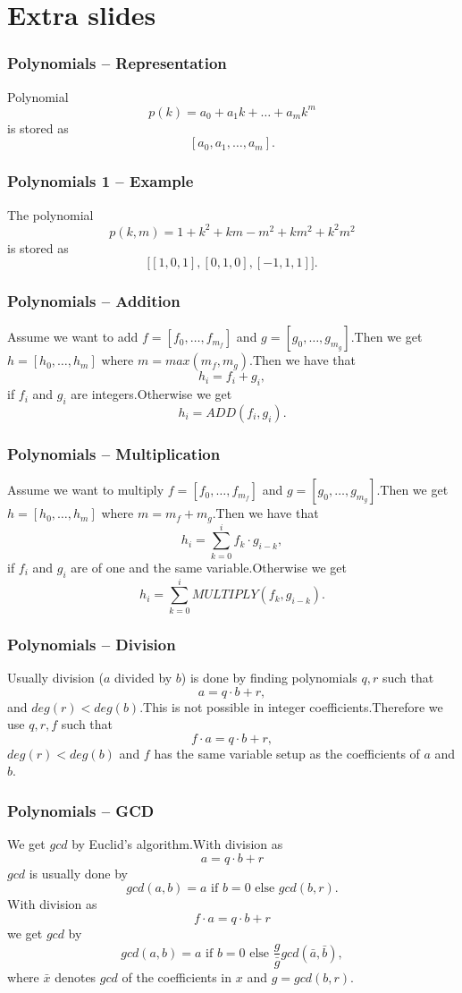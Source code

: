 \documentclass{beamer}
\begin{document}
\section*{Extra slides}%
\begin{frame}
  \frametitle{Polynomials -- Representation}
  Polynomial $$p(k)=a_0+a_1k+\ldots+a_mk^m$$ is stored as $$[a_0,a_1,\ldots,a_m].$$
\end{frame}
\begin{frame}
  \frametitle{Polynomials 1 -- Example}
  The polynomial $$p(k,m)=1+k^2+km-m^2+km^2+k^2m^2$$ is stored as $$\Big[[1,0,1],[0,1,0],[-1,1,1]\Big].$$
\end{frame}
\begin{frame}
  \frametitle{Polynomials -- Addition}
  Assume we want to add $f=[f_0,\ldots,f_{m_f}]$ and $g=[g_0,\ldots,g_{m_g}]$.\pause Then we get $h=[h_0,\ldots,h_m]$ where $m=max(m_f,m_g)$.\pause Then we have that
  $$h_i=f_i+g_i,$$
  if $f_i$ and $g_i$ are integers.\pause Otherwise we get
  $$h_i=ADD(f_i,g_i).$$
\end{frame}
\begin{frame}
  \frametitle{Polynomials -- Multiplication}
  Assume we want to multiply $f=[f_0,\ldots,f_{m_f}]$ and $g=[g_0,\ldots,g_{m_g}]$.\pause Then we get $h=[h_0,\ldots,h_m]$ where $m=m_f+m_g$.\pause Then we have that
  $$h_i=\sum_{k=0}^i f_k\cdot g_{i-k},$$
  if $f_i$ and $g_i$ are of one and the same variable.\pause Otherwise we get
  $$h_i=\sum_{k=0}^i MULTIPLY(f_k,g_{i-k}).$$
\end{frame}
\begin{frame}
  \frametitle{Polynomials -- Division}
  Usually division ($a$ divided by $b$) is done by finding polynomials $q,r$ such that $$a=q\cdot b + r,$$
  and $deg(r)<deg(b)$.\pause This is not possible in integer coefficients.\pause Therefore we use $q,r,f$ such that $$f\cdot a=q\cdot b + r,$$ $deg(r)<deg(b)$ and $f$ has the same variable setup as the coefficients of $a$ and $b$.
\end{frame}
\begin{frame}
  \frametitle{Polynomials -- GCD}
  We get $gcd$ by Euclid's algorithm.\pause  With division as $$a=q\cdot b + r$$ $gcd$ is usually done by $$gcd(a,b)=a \text{ if } b=0 \text{ else } gcd(b,r).$$\pause
  With division as $$f\cdot a=q\cdot b + r$$ we get $gcd$ by $$gcd(a,b)=a \text{ if } b=0 \text{ else } \frac{g}{\bar{g}}gcd(\bar{a},\bar{b}),$$ where $\bar{x}$ denotes $gcd$ of the coefficients in $x$ and $g=gcd(b,r)$.
\end{frame}
\end{document}
